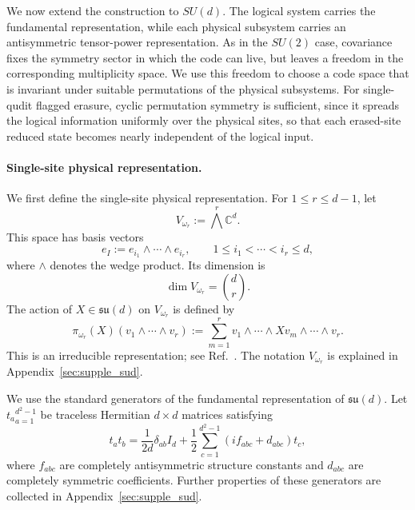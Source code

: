 \documentclass[10pt,twocolumn,superscriptaddress,aps,amsmath,amssymb,citeautoscript,floatfix,prx]{revtex4-2}
\theoremstyle{plain}
\theoremstyle{plain}
\theoremstyle{plain}
\theoremstyle{plain}
\theoremstyle{plain}
\theoremstyle{plain}
\theoremstyle{plain}
\theoremstyle{definition}
\theoremstyle{plain}
\begin{document}
We now extend the construction to $SU(d)$. The logical system carries the fundamental representation, while each physical subsystem carries an antisymmetric 
tensor-power representation. As in the $SU(2)$ case, covariance fixes the symmetry sector in which the code can live, but leaves a freedom in the corresponding multiplicity space. 
We use this freedom to choose a code space that is invariant under suitable permutations of the physical subsystems. For single-qudit flagged erasure, 
cyclic permutation symmetry is sufficient, since it spreads the logical information uniformly over the physical sites, 
so that each erased-site reduced state becomes nearly independent of the logical input.

\paragraph{Single-site physical representation.}

We first define the single-site physical representation. For $1\le r\le d-1$, let
\begin{equation}\label{eq:vomegar_def}
V_{\omega_r}:=\bigwedge^r \mathbb C^d .
\end{equation}
This space has basis vectors
$$
e_I:=e_{i_1}\wedge\cdots\wedge e_{i_r},
\qquad
1\le i_1<\cdots<i_r\le d,
$$
where $\wedge$ denotes the wedge product. Its dimension is
$$
\dim V_{\omega_r}=\binom{d}{r}.
$$
The action of $X\in\mathfrak{su}(d)$ on $V_{\omega_r}$ is defined by
\begin{equation}\label{eq:sud_vomegar_def}
\pi_{\omega_r}(X)
\left(v_1\wedge\cdots\wedge v_r\right)
:=
\sum_{m=1}^r
v_1\wedge\cdots\wedge Xv_m\wedge\cdots\wedge v_r .
\end{equation}
This is an irreducible representation; see Ref.~\cite{FultonHarris1991}. The notation $V_{\omega_r}$ is explained in Appendix~\ref{sec:supple_sud}.

We use the standard generators of the fundamental representation of $\mathfrak{su}(d)$. Let ${t_a}_{a=1}^{d^2-1}$ be traceless Hermitian $d\times d$ matrices satisfying
\begin{equation}
t_a t_b
=
\frac{1}{2d}\delta_{ab}I_d
+
\frac12
\sum_{c=1}^{d^2-1}
\left(i f_{abc}+d_{abc}\right)t_c ,
\end{equation}
where $f_{abc}$ are completely antisymmetric structure constants and $d_{abc}$ are completely symmetric coefficients. 
Further properties of these generators are collected in Appendix~\ref{sec:supple_sud}.
\end{document}
